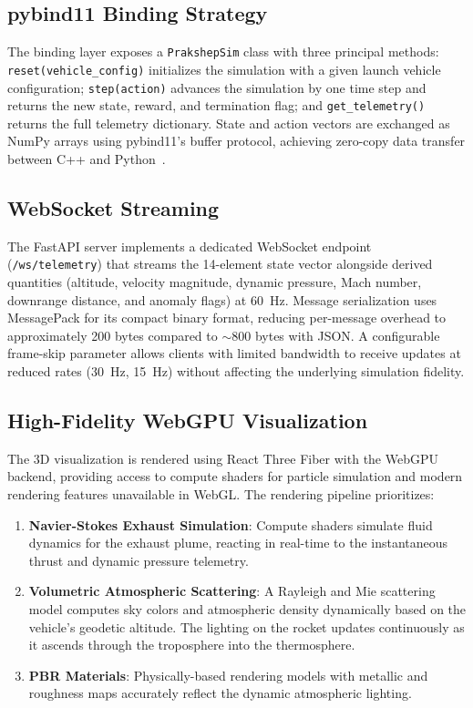 \documentclass[conference]{IEEEtran}
\begin{document}
\subsection{pybind11 Binding Strategy}

The binding layer exposes a \texttt{PrakshepSim} class with three principal methods: \texttt{reset(vehicle\_config)} initializes the simulation with a given launch vehicle configuration; \texttt{step(action)} advances the simulation by one time step and returns the new state, reward, and termination flag; and \texttt{get\_telemetry()} returns the full telemetry dictionary. State and action vectors are exchanged as NumPy arrays using pybind11's buffer protocol, achieving zero-copy data transfer between C++ and Python~\cite{jakob2017pybind11}.

\subsection{WebSocket Streaming}

The FastAPI server implements a dedicated WebSocket endpoint (\texttt{/ws/telemetry}) that streams the 14-element state vector alongside derived quantities (altitude, velocity magnitude, dynamic pressure, Mach number, downrange distance, and anomaly flags) at 60~Hz. Message serialization uses MessagePack for its compact binary format, reducing per-message overhead to approximately 200 bytes compared to $\sim$800 bytes with JSON. A configurable frame-skip parameter allows clients with limited bandwidth to receive updates at reduced rates (30~Hz, 15~Hz) without affecting the underlying simulation fidelity.

\subsection{High-Fidelity WebGPU Visualization}

The 3D visualization is rendered using React Three Fiber with the WebGPU backend, providing access to compute shaders for particle simulation and modern rendering features unavailable in WebGL. The rendering pipeline prioritizes:
\begin{enumerate}
    \item \textbf{Navier-Stokes Exhaust Simulation}: Compute shaders simulate fluid dynamics for the exhaust plume, reacting in real-time to the instantaneous thrust and dynamic pressure telemetry.
    \item \textbf{Volumetric Atmospheric Scattering}: A Rayleigh and Mie scattering model computes sky colors and atmospheric density dynamically based on the vehicle's geodetic altitude. The lighting on the rocket updates continuously as it ascends through the troposphere into the thermosphere.
    \item \textbf{PBR Materials}: Physically-based rendering models with metallic and roughness maps accurately reflect the dynamic atmospheric lighting.
\end{enumerate}
\end{document}
